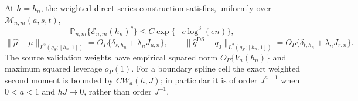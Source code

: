 At \(h=h_n\), the weighted direct-series construction satisfies, uniformly over \(\mathcal M_{n,m}(a,s,t)\),
\[
 \mathbb P_{n,m}\{\mathcal E_{n,m}(h_n)^c\}\le C\exp\{-c\log^3(en)\},
\]
\[
 \|\widehat\mu-\mu\|_{L^2(g_S;[h_n,1])}
 =O_P\{\delta_{s,h_n}+\lambda_nJ_{\mu,n}\},
 \qquad
 \|\widehat q^{\mathrm{DS}}-q_0\|_{L^2(g_S;[h_n,1])}
 =O_P\{\delta_{t,h_n}+\lambda_nJ_{r,n}\}.
\]
The source validation weights have empirical squared norm \(O_P\{V_a(h_n)\}\) and maximum squared leverage \(o_P(1)\).  For a boundary spline cell the exact weighted second moment is bounded by \(CW_a(h,J)\); in particular it is of order \(J^{a-1}\) when \(0<a<1\) and \(hJ\to0\), rather than order \(J^{-1}\).